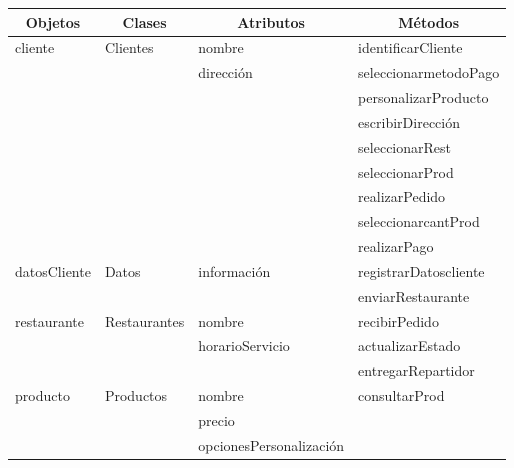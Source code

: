 \documentclass[12pt]{article}
\begin{document}
\begin{table}[H]
\begin{tabular}{|l|l|l|l|}
\hline
\multicolumn{1}{|c|}{\textbf{Objetos}} & \multicolumn{1}{c|}{\textbf{Clases}} & \multicolumn{1}{c|}{\textbf{Atributos}} & \multicolumn{1}{c|}{\textbf{Métodos}} \\
\hline 
cliente      & Clientes     & nombre                                        & identificarCliente \\ 
             &              & dirección                                     & seleccionarmetodoPago \\
             &              &                                               & personalizarProducto \\
             &              &                                               & escribirDirección \\
             &              &                                               & seleccionarRest \\ 
             &              &                                               & seleccionarProd \\ 
             &              &                                               & realizarPedido \\
             &              &                                               & seleccionarcantProd \\
             &              &                                               & realizarPago \\ \hline
datosCliente & Datos        & información                                   & registrarDatoscliente \\
             &              &                                               & enviarRestaurante \\ \hline
restaurante  & Restaurantes & nombre                                        & recibirPedido \\  
             &              & horarioServicio                               & actualizarEstado \\
             &              &                                               & entregarRepartidor \\ \hline
producto     & Productos    & nombre                                        & consultarProd \\
             &              & precio                                        & \\
             &              & opcionesPersonalización                       & \\

\end{tabular}
\end{table}
\end{document}
